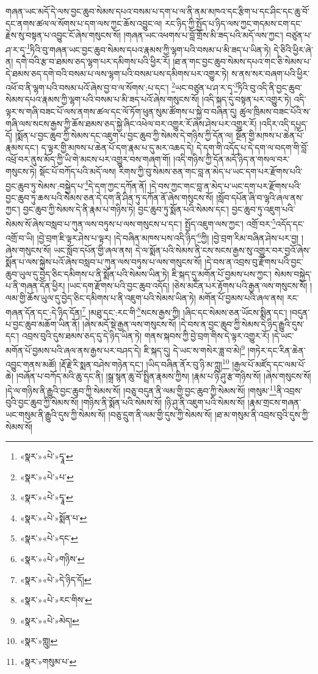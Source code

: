 གཞན་ཡང་མདོ་དེ་ལས་བྱང་ཆུབ་སེམས་དཔའ་བསམ་པ་དག་པ་ལ་ནི་ནམ་མཁའ་དང་རྩིག་པ་དང་ཤིང་དང་ཆུ་བོ་དང་ནགས་ཚལ་ལ་སོགས་པ་དག་ལས་ཀྱང་ཆོས་འབྱུང་ལ། རང་ཉིད་ཀྱི་སྤྱོད་པ་ཉིད་ལས་ཀྱང་གདམས་ངག་དང་རྗེས་སུ་བསྟན་པ་འབྱུང་ངོ་ཞེས་གསུངས་སོ། །གཞན་ཡང་འཕགས་པ་བློ་གྲོས་མི་ཟད་པའི་མདོ་ལས་ཀྱང་། བཙུན་པ་ཤ་ར་དྭ་\footnote{«སྣར་»«པེ་»དྭཱ་}ཏིའི་བུ་གཞན་ཡང་བྱང་ཆུབ་སེམས་དཔའ་རྣམས་ཀྱི་ལྷག་པའི་བསམ་པ་མི་ཟད་པ་ཡིན་ཏེ། དེ་ཅིའི་ཕྱིར་ཞེ་ན། དགེ་བའི་རྩ་བ་ཐམས་ཅད་ལྷག་པར་དམིགས་པའི་ཕྱིར་རོ། །ཐ་ན་གང་བྱང་ཆུབ་སེམས་དཔའ་གང་ཅི་སེམས་པ་དེ་ཐམས་ཅད་དགེ་བའི་བསམ་པ་ལས་ལྷག་པའི་བསམ་པས་དམིགས་པར་འགྱུར་ཏེ། ས་ནས་སར་བཞག་པའི་ཕྱིར་འཕོ་བ་ནི་ལྷག་པའི་བསམ་པའོ་ཞེས་བྱ་བ་ལ་སོགས་:པ་དང་། \footnote{«སྣར་»«པེ་»པ་}ཡང་བཙུན་པ་ཤ་ར་དྭ་\footnote{«སྣར་»«པེ་»དྭཱ་}ཏིའི་བུ་འདི་ནི་བྱང་ཆུབ་སེམས་དཔའ་རྣམས་ཀྱི་ལྷག་པའི་བསམ་པ་མི་ཟད་པའོ་ཞེས་གསུངས་སོ། །འདི་སྐད་དུ་བསྟན་པར་འགྱུར་ཏེ། འདི་ལྟར་ས་གཞི་བཟང་པོ་ལས་ནགས་ཚལ་དང་ལོ་ཏོག་ཕུན་སུམ་ཚོགས་པ་སྐྱེ་བ་བཞིན་དུ། ཚུལ་ཁྲིམས་བཟང་པོའི་ས་གཞི་ལས་སངས་རྒྱས་ཀྱི་ཆོས་ཐམས་ཅད་སྐྱེ་ཞིང་འཕེལ་བར་འགྱུར་རོ་ཞེས་ཤེས་པར་འགྱུར་རོ། །འདིར་འདི་དཔྱད་དོ། །སྨོན་པ་བྱང་ཆུབ་ཀྱི་སེམས་དང་འཇུག་པ་བྱང་ཆུབ་ཀྱི་སེམས་དེ་གཉིས་ཀྱི་དོན་ལ། སྔོན་གྱི་མཁས་པ་ཆེན་པོ་རྣམས་དང་། ད་ལྟར་གྱི་མཁས་པ་ཆེན་པོ་དག་རྣམ་པ་དུ་མར་འཆད་དེ། དེ་དག་གི་འདོད་པ་དེ་དག་ལ་བདག་གི་བློ་འཕྲོ་བར་ནུས་མོད་ཀྱི་ཡི་གེ་མངས་པར་འགྱུར་བས་གཞག་གོ། །འདི་གཉིས་ཀྱི་དོན་མདོ་ཉིད་ན་གསལ་བར་གསུངས་ཏེ། སྡོང་པོ་བཀོད་པའི་མདོ་ལས། རིགས་ཀྱི་བུ་སེམས་ཅན་གང་བླ་ན་མེད་པ་ཡང་དག་པར་རྫོགས་པའི་བྱང་ཆུབ་ཏུ་སེམས་:བསྐྱེད་པ་\footnote{«སྣར་»«པེ་»སྨོན་པ་}དེ་དག་ཀྱང་དཀོན་ནོ། །དེ་བས་ཀྱང་གང་བླ་ན་མེད་པ་ཡང་དག་པར་རྫོགས་པའི་བྱང་ཆུབ་ཏུ་ཆས་པའི་སེམས་ཅན་དེ་དག་ནི་ཤིན་ཏུ་དཀོན་ནོ་ཞེས་གསུངས་སོ། །སློབ་དཔོན་ཞི་བ་ལྷའི་ཞལ་ནས་ཀྱང་། བྱང་ཆུབ་ཀྱི་སེམས་དེ་ནི་རྣམ་པ་གཉིས་ཏེ། བྱང་ཆུབ་ཏུ་སྨོན་པའི་སེམས་དང་། བྱང་ཆུབ་ཏུ་འཇུག་པའི་སེམས་སོ་ཞེས་བསླབ་པ་ཀུན་ལས་བཏུས་པ་ལས་གསུངས་པ་དང་། སྤྱོད་འཇུག་ལས་ཀྱང་། འགྲོ་བར་\footnote{«སྣར་»«པེ་»དང་}འདོད་དང་འགྲོ་བ་ཡི། །བྱེ་བྲག་ཇི་ལྟར་ཤེས་པ་ལྟར། །དེ་བཞིན་མཁས་པས་འདི་ཉིད་\footnote{«སྣར་»«པེ་»གཉིས་}ཀྱི། །བྱེ་བྲག་རིམ་བཞིན་ཤེས་པར་བྱ། །ཞེས་གསུངས་སོ། ཡང་སློབ་དཔོན་གྱི་ཞལ་ནས། དེ་ལ་སྨོན་པའི་སེམས་ནི་ངས་སངས་རྒྱས་སུ་འགྱུར་བར་བྱའོ་ཞེས་སྨོན་པ་ལས་སྐྱེས་པའོ་ཞེས་བསླབ་པ་ཀུན་ལས་བཏུས་པ་ལས་གསུངས་སོ། །དེ་བས་ན་འབྲས་བུ་རྫོགས་པའི་བྱང་ཆུབ་ཡུལ་དུ་བྱེད་ཅིང་དམིགས་པ་ནི་སྨོན་པའི་སེམས་ཡིན་ཏེ། ཇི་སྐད་དུ་མགོན་པོ་བྱམས་པས་ཀྱང་། སེམས་བསྐྱེད་པ་ནི་གཞན་དོན་ཕྱིར། །ཡང་དག་རྫོགས་པའི་བྱང་ཆུབ་འདོད། །ཅེས་མངོན་པར་རྟོགས་པའི་རྒྱན་ལས་གསུངས་སོ། །ལམ་གྱི་ཆོས་ཡུལ་དུ་བྱེད་ཅིང་དམིགས་པ་ནི་འཇུག་པའི་སེམས་ཡིན་ཏེ། མགོན་པོ་བྱམས་པའི་ཞལ་ནས། རང་གཞན་དོན་དང་:དེ་ཉིད་དོན།\footnote{«སྣར་»«པེ་»དེ་ཉིད་དོ།} །མཐུ་དང་:རང་གི་\footnote{«སྣར་»«པེ་»རང་གིས་}སངས་རྒྱས་ཀྱི། །ཞིང་དང་སེམས་ཅན་ཡོངས་སྨིན་དང་། །བདུན་པ་བྱང་ཆུབ་མཆོག་ཡིན་ནོ། །ཞེས་མདོ་སྡེ་རྒྱན་ལས་གསུངས་སོ། །དེ་བས་ན་བྱང་ཆུབ་ཀྱི་སེམས་དེ་ཉིད་རྒྱུའི་དུས་དང་། འབྲས་བུའི་དུས་ཐམས་ཅད་དུ་དེ་ཉིད་ཡིན་ཏེ། གནས་སྐབས་ཀྱི་བྱེ་བྲག་གིས་དེ་ལྟར་འགྱུར་རོ། །དེ་ཡང་མགོན་པོ་བྱམས་པའི་ཞལ་ནས་རྒྱས་པར་བཤད་དེ། ཇི་སྐད་དུ། དེ་ཡང་ས་གསེར་ཟླ་བ་མེ།\footnote{«སྣར་»«པེ་»མེད།} །གཏེར་དང་རིན་ཆེན་འབྱུང་གནས་མཚོ། །རྡོ་རྗེ་རི་སྨན་བཤེས་གཉེན་དང་། །ཡིད་བཞིན་ནོར་བུ་ཉི་མ་ཀླུ།\footnote{«སྣར་»གླུ།} །རྒྱལ་པོ་མཛོད་དང་ལམ་པོ་ཆེ། །བཞོན་པ་བཀོད་མའི་ཆུ་དང་ནི། །སྒྲ་སྙན་ཆུ་བོ་སྤྲིན་རྣམས་ཀྱིས། །རྣམ་པ་ཉི་ཤུ་རྩ་གཉིས་སོ། །ཞེས་གསུངས་སོ། །དེ་ལ་གཉིས་ནི་རྒྱུའི་བྱང་ཆུབ་ཀྱི་སེམས་སོ། །བཅུ་བདུན་ནི་ལམ་གྱི་བྱང་ཆུབ་ཀྱི་སེམས་སོ། །གསུམ་\footnote{«སྣར་»གསུམ་པ་}ནི་འབྲས་བུའི་བྱང་ཆུབ་ཀྱི་སེམས་སོ། །གཉིས་ནི་སྨོན་པའི་སེམས་སོ། །ཉི་ཤུ་ནི་འཇུག་པའི་སེམས་སོ། །རྣམ་གྲངས་གཞན་ཡང་གསུམ་ནི་རྒྱུའི་དུས་ཀྱི་སེམས་སོ། །བཅུ་དྲུག་ནི་ལམ་གྱི་དུས་ཀྱི་སེམས་སོ། །ཐ་མ་གསུམ་ནི་འབྲས་བུའི་དུས་ཀྱི་སེམས་སོ། 